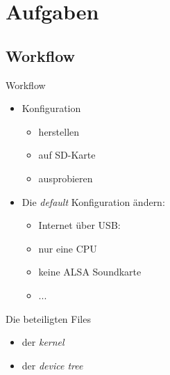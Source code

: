 \section{Aufgaben}
\subsection{Workflow}
\begin{frame}{Workflow}
 \begin{itemize}
  \item {} Konfiguration
  \begin{itemize}
   \item herstellen
   \item auf SD-Karte
   \item ausprobieren
  \end{itemize}
  \item Die {\em default} Konfiguration ändern:
  \begin{itemize}
   \item Internet über USB:
   
\begin{minipage}{0.75\linewidth}
\end{minipage}
   \item nur eine CPU
   \item keine ALSA Soundkarte
   \item ... 
  \end{itemize}
 \end{itemize}
\end{frame}

\begin{frame}{Die beteiligten Files}
 \begin{itemize}
  \item {} der {\em kernel}
  \item {} der {\em device tree}
 \end{itemize}
\end{frame}
